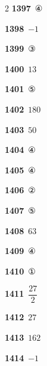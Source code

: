 \documentclass[10pt,a4paper]{article}
\begin{document}
\begin{multicols}{2}
\noindent\textbf{1397}\ ④\par
\noindent\textbf{1398}\ $-1$\par
\noindent\textbf{1399}\ ③\par
\noindent\textbf{1400}\ $13$\par
\noindent\textbf{1401}\ ⑤\par
\noindent\textbf{1402}\ $180$\par
\noindent\textbf{1403}\ $50$\par
\noindent\textbf{1404}\ ④\par
\noindent\textbf{1405}\ ④\par
\noindent\textbf{1406}\ ②\par
\noindent\textbf{1407}\ ⑤\par
\noindent\textbf{1408}\ $63$\par
\noindent\textbf{1409}\ ④\par
\noindent\textbf{1410}\ ①\par
\noindent\textbf{1411}\ $\dfrac{27}{2}$\par
\noindent\textbf{1412}\ $27$\par
\noindent\textbf{1413}\ $162$\par
\noindent\textbf{1414}\ $-1$\par
\end{multicols}
\end{document}
